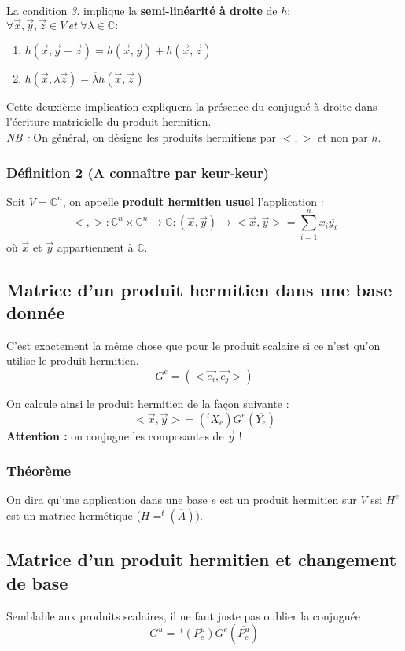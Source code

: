 \documentclass[12pt, a4paper, openany]{article}
\begin{document}
La condition \textit{3.} implique la \textbf{semi-linéarité à droite} de $h$:\\
$\forall \vec{x}, \vec{y}, \vec{z} \in V\ et\ \forall \lambda \in \mathbb{C} :$
\begin{enumerate}
\item $h(\vec{x}, \vec{y} + \vec{z}) = h(\vec{x}, \vec{y}) + h(\vec{x}, \vec{z})$
\item $h(\vec{x}, \lambda\vec{z}) = \overline{\lambda}h(\vec{x}, \vec{z})$
\end{enumerate}
Cette deuxième implication expliquera la présence du conjugué à droite dans l'écriture matricielle du produit hermitien. \\
\textit{NB :} On général, on désigne les produits hermitiens par $< , >$ et non par $h$.

\subsubsection*{Définition 2 (A connaître par keur-keur)}
Soit $V = \mathbb{C}^n$, on appelle \textbf{produit hermitien usuel} l'application :
$$< , > : \mathbb{C}^n  \times \mathbb{C}^n \rightarrow \mathbb{C} : (\vec{x}, \vec{y}) \rightarrow <\vec{x}, \vec{y}> = \sum_{i=1}^n x_i\overline{y_i}$$
où $\vec{x}$ et $\vec{y}$ appartiennent à $\mathbb{C}$.

\subsection{Matrice d'un produit hermitien dans une base donnée}
C'est exactement la même chose que pour le produit scalaire si ce n'est qu'on utilise le produit hermitien.
$$G^e = \left( <\vec{e_i}, \vec{e_j}>\right)$$

On calcule ainsi le produit hermitien de la façon suivante : 
$$<\vec{x}, \vec{y}> = \left(^t X_e\right)G^e\left(\overline{Y_e}\right)$$
\textbf{Attention :} on conjugue les composantes de $\vec{y}$ !

\subsubsection*{Théorème}
On dira qu'une application dans une base $e$ est un produit hermitien sur $V$ ssi $H^e$ est un matrice hermétique ($H = ^t(\overline{A})$).

\subsection{Matrice d'un produit hermitien et changement de base}
Semblable aux produits scalaires, il ne faut juste pas oublier la conjuguée
$$G^u =\ ^t(P^u_e) G^e (\overline{P^u_e})$$
\end{document}
